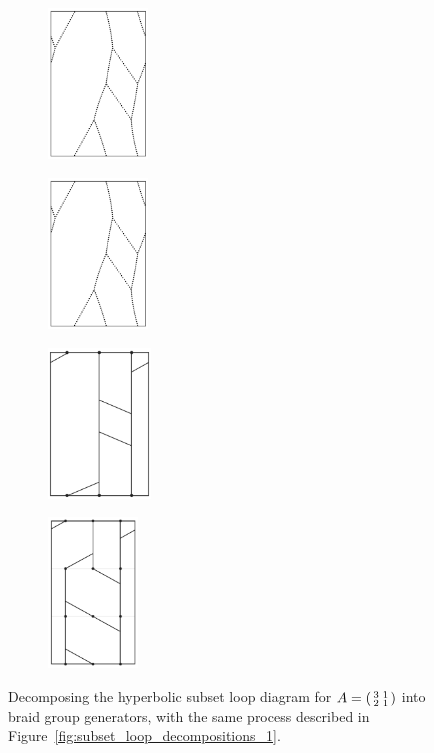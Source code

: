 \documentclass[12pt,twoside]{reedthesis}
\theoremstyle{definition}
\begin{document}
\begin{figure}[p]
  \centering
  \begin{subfigure}[t]{0.24\linewidth}
    \centering
    \includegraphics[height=4cm]{figures/subset_loop_pqq.pdf}
  \end{subfigure}
  \hfill
  \begin{subfigure}[t]{0.24\linewidth}
    \centering
    \includegraphics[height=4cm]{figures/subset_loop_pqq_shifted.pdf}
  \end{subfigure}
  \hfill
  \begin{subfigure}[t]{0.24\linewidth}
    \centering
    \includegraphics[height=4cm]{figures/subset_loop_pqq_normalized.pdf}
  \end{subfigure}
  \hfill
  \begin{subfigure}[t]{0.24\linewidth}
    \centering
    \includegraphics[height=4cm]{figures/subset_loop_pqq_decomposed.pdf}
  \end{subfigure}
  \caption{Decomposing the hyperbolic subset loop diagram for $A = \protect\begin{psmallmatrix}3 & 1 \\ 2 & 1\protect\end{psmallmatrix}$ into braid group generators, with the same process described in Figure~\ref{fig:subset_loop_decompositions_1}.}
  \label{fig:subset_loop_decompositions_2}
\end{figure}
\end{document}
